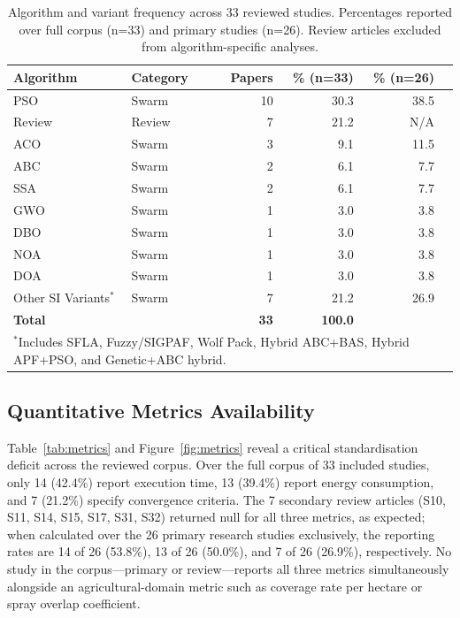 \documentclass[review,3p,times]{elsarticle}
\begin{document}
\begin{table}[htbp]
\centering
\caption{Algorithm and variant frequency across 33 reviewed studies. Percentages reported over full corpus (n=33) and primary studies (n=26). Review articles excluded from algorithm-specific analyses.}
\label{tab:algorithms}
\begin{tabular}{llrrrr}
\toprule
\textbf{Algorithm} & \textbf{Category} & \textbf{Papers} & \textbf{\% (n=33)} & \textbf{\% (n=26)} \\
\midrule
PSO & Swarm & 10 & 30.3 & 38.5 \\
Review & Review & 7 & 21.2 & N/A \\
ACO & Swarm & 3 & 9.1 & 11.5 \\
ABC & Swarm & 2 & 6.1 & 7.7 \\
SSA & Swarm & 2 & 6.1 & 7.7 \\
GWO & Swarm & 1 & 3.0 & 3.8 \\
DBO & Swarm & 1 & 3.0 & 3.8 \\
NOA & Swarm & 1 & 3.0 & 3.8 \\
DOA & Swarm & 1 & 3.0 & 3.8 \\
Other SI Variants$^*$ & Swarm & 7 & 21.2 & 26.9 \\
\midrule
\textbf{Total} & & \textbf{33} & \textbf{100.0} & \\
\bottomrule
\multicolumn{5}{l}{$^*$Includes SFLA, Fuzzy/SIGPAF, Wolf Pack, Hybrid ABC+BAS, Hybrid APF+PSO, and Genetic+ABC hybrid.}
\end{tabular}
\end{table}

\subsection{Quantitative Metrics Availability}

Table~\ref{tab:metrics} and Figure~\ref{fig:metrics} reveal a critical standardisation deficit across the reviewed corpus. Over the full corpus of 33 included studies, only 14 (42.4\%) report execution time, 13 (39.4\%) report energy consumption, and 7 (21.2\%) specify convergence criteria. The 7 secondary review articles (S10, S11, S14, S15, S17, S31, S32) returned null for all three metrics, as expected; when calculated over the 26 primary research studies exclusively, the reporting rates are 14 of 26 (53.8\%), 13 of 26 (50.0\%), and 7 of 26 (26.9\%), respectively. No study in the corpus---primary or review---reports all three metrics simultaneously alongside an agricultural-domain metric such as coverage rate per hectare or spray overlap coefficient.
\end{document}
